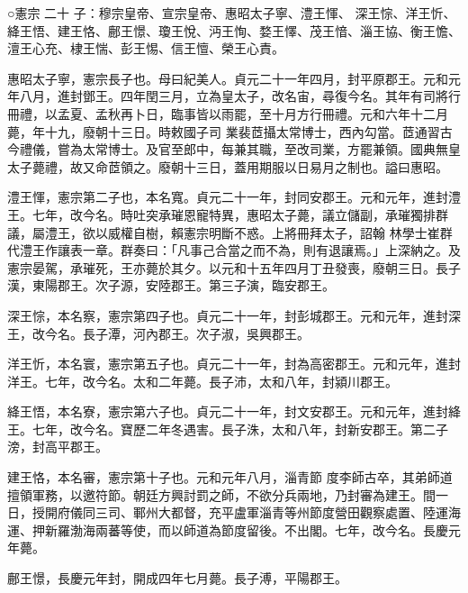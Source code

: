 
\begin{pinyinscope}

 ○憲宗
 二十
 子：穆宗皇帝、宣宗皇帝、惠昭太子寧、澧王惲、
 深王悰、洋王忻、絳王悟、建王恪、鄜王憬、瓊王悅、沔王恂、婺王懌、茂王愔、淄王協、衡王憺、澶王心充、棣王惴、彭王惕、信王憻、榮王心責。



 惠昭太子寧，憲宗長子也。母曰紀美人。貞元二十一年四月，封平原郡王。元和元年八月，進封鄧王。四年閏三月，立為皇太子，改名宙，尋復今名。其年有司將行冊禮，以孟夏、孟秋再卜日，臨事皆以雨罷，至十月方行冊禮。元和六年十二月薨，年十九，廢朝十三日。時敕國子司
 業裴茝攝太常博士，西內勾當。茝通習古今禮儀，嘗為太常博士。及官至郎中，每兼其職，至改司業，方罷兼領。國典無皇太子薨禮，故又命茝領之。廢朝十三日，蓋用期服以日易月之制也。謚曰惠昭。



 澧王惲，憲宗第二子也，本名寬。貞元二十一年，封同安郡王。元和元年，進封澧王。七年，改今名。時吐突承璀恩寵特異，惠昭太子薨，議立儲副，承璀獨排群議，屬澧王，欲以威權自樹，賴憲宗明斷不惑。上將冊拜太子，詔翰
 林學士崔群代澧王作讓表一章。群奏曰：「凡事己合當之而不為，則有退讓焉。」上深納之。及憲宗晏駕，承璀死，王亦薨於其夕。以元和十五年四月丁丑發喪，廢朝三日。長子漢，東陽郡王。次子源，安陸郡王。第三子演，臨安郡王。



 深王悰，本名察，憲宗第四子也。貞元二十一年，封彭城郡王。元和元年，進封深王，改今名。長子潭，河內郡王。次子淑，吳興郡王。



 洋王忻，本名寰，憲宗第五子也。貞元二十一年，封為高密郡王。元和元年，進封洋王。七年，改今名。太和二年薨。長子沛，太和八年，封潁川郡王。



 絳王悟，本名寮，憲宗第六子也。貞元二十一年，封文安郡王。元和元年，進封絳王。七年，改今名。寶歷二年冬遇害。長子洙，太和八年，封新安郡王。第二子滂，封高平郡王。



 建王恪，本名審，憲宗第十子也。元和元年八月，淄青節
 度李師古卒，其弟師道擅領軍務，以邀符節。朝廷方興討罰之師，不欲分兵兩地，乃封審為建王。間一日，授開府儀同三司、鄆州大都督，充平盧軍淄青等州節度營田觀察處置、陸運海運、押新羅渤海兩蕃等使，而以師道為節度留後。不出閣。七年，改今名。長慶元年薨。



 鄜王憬，長慶元年封，開成四年七月薨。長子溥，平陽郡王。




\end{pinyinscope}
